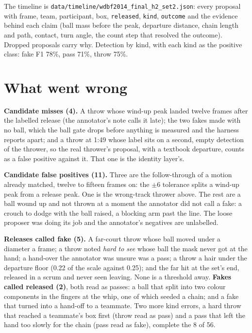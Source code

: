 \documentclass[10pt,a4paper]{article}
\begin{document}
The timeline is \texttt{data/timeline/wdbf2014\_final\_h2\_set2.json}: every proposal
with frame, team, participant, box, \texttt{released}, \texttt{kind}, \texttt{outcome} and
the evidence behind each claim (ball mass before the peak, departure distance, chain length
and path, contact, turn angle, the count step that resolved the outcome). Dropped
proposals carry why. Detection by kind, with each kind as the positive class: fake F1 78\%,
pass 71\%, throw 75\%.

\section{What went wrong}
\label{sec:wrong}

\textbf{Candidate misses (4).} A throw whose wind-up peak landed twelve frames after the
labelled release (the annotator's note calls it late); the two fakes made with no ball,
which the ball gate drops before anything is measured and the harness reports apart; and a throw at 1:49
whose label sits on a second, empty detection of the thrower, so the real thrower's
proposal, with a textbook departure, counts as a false positive against it. That one is the
identity layer's.

\textbf{Candidate false positives (11).} Three are the follow-through of a motion already
matched, twelve to fifteen frames on: the $\pm$6 tolerance splits a wind-up peak from a
release peak. One is the wrong-track thrower above. The rest are a ball wound up and not
thrown at a moment the annotator did not call a fake: a crouch to dodge with the ball
raised, a blocking arm past the line. The loose proposer was doing its job and the
annotator's negatives are unlabelled.

\textbf{Releases called fake (5).} A far-court throw whose ball moved under a diameter a
frame; a throw noted \emph{hard to see} whose ball the mask never got at the hand; a
hand-over the annotator was unsure was a pass; a throw a hair under the departure floor
(0.22 of the scale against 0.25); and the far hit at the set's end, released in a scrum and
never seen leaving. None is a threshold away. \textbf{Fakes called released (2)}, both read
as passes: a ball that split into two colour components in the fingers at the whip, one of
which seeded a chain; and a fake that turned into a hand-off to a teammate. Two more kind
errors, a hard throw that reached a teammate's box first (throw read as pass) and a pass
that left the hand too slowly for the chain (pass read as fake), complete the 8 of 56.
\end{document}
